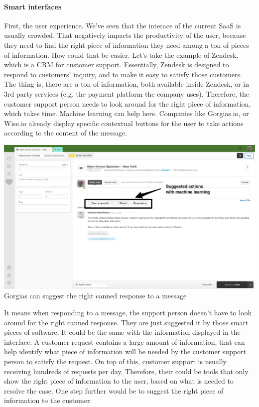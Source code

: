 \documentclass[12pt]{article}
\begin{document}
\paragraph{Smart interfaces}

First, the user experience. We've seen that the interace of the current SaaS is usually crowded. That negatively impacts the productivity of the user, because they need to find the right piece of information they need among a ton of pieces of information. How could that be easier. Let's take the example of Zendesk, which is a CRM for customer support. Essentially, Zendesk is designed to respond to customers' inquiry, and to make it easy to satisfy those customers. The thing is, there are a ton of information, both available inside Zendesk, or in 3rd party services (e.g. the payment platform the company uses). Therefore, the customer support person needs to look around for the right piece of information, which takes time. Machine learning can help here. Companies like Gorgias.io, or Wise.io already display specific contextual buttons for the user to take actions according to the content of the message.

\smallskip
\includegraphics[width=\textwidth]{zendesk}
Gorgias can suggest the right canned response to a message
\smallskip

It means when responding to a message, the support person doesn't have to look around for the right canned response. They are just suggested it by those smart pieces of software.
It could be the same with the information displayed in the interface. A customer request contains a large amount of information, that can help identify what piece of information will be needed by the customer support person to satisfy the request. On top of this, customer support is usually receiving hundreds of requests per day. Therefore, their could be tools that only show the right piece of information to the user, based on what is needed to resolve the case. One step further would be to suggest the right piece of information to the customer.
\end{document}
